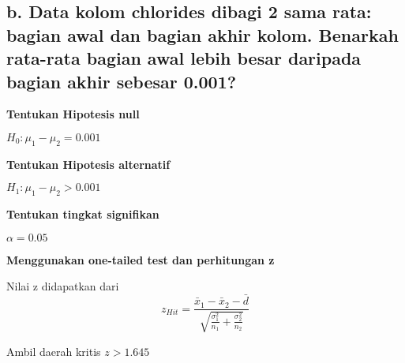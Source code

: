 \documentclass[11pt]{article}
\begin{document}
    \hypertarget{b.-data-kolom-chlorides-dibagi-2-sama-rata-bagian-awal-dan-bagian-akhir-kolom.-benarkah-rata-rata-bagian-awal-lebih-besar-daripada-bagian-akhir-sebesar-0.001}{%
\subsection{b. Data kolom chlorides dibagi 2 sama rata: bagian awal dan
bagian akhir kolom. Benarkah rata-rata bagian awal lebih besar daripada
bagian akhir sebesar
0.001?}\label{b.-data-kolom-chlorides-dibagi-2-sama-rata-bagian-awal-dan-bagian-akhir-kolom.-benarkah-rata-rata-bagian-awal-lebih-besar-daripada-bagian-akhir-sebesar-0.001}}

    \textbf{Tentukan Hipotesis null}

\(H_0 : \mu_1 - \mu_2 = 0.001\)

\textbf{Tentukan Hipotesis alternatif}

\(H_1 : \mu_1 - \mu_2 > 0.001\)

\textbf{Tentukan tingkat signifikan}

\(\alpha = 0.05\)

\textbf{Menggunakan one-tailed test dan perhitungan z}

Nilai z didapatkan dari
\[ z_{Hit} = \frac{\bar{x}_1-\bar{x}_2 - \bar{d}}{\sqrt{\frac{\sigma_1^2}{n_1} + \frac{\sigma_2^2}{n_2}}}\]

Ambil daerah kritis \(z > 1.645\)
\end{document}
